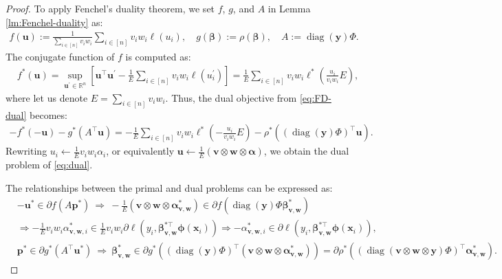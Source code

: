 	\begin{proof}
	To apply Fenchel's duality theorem, we set $f$, $g$, and $A$ in Lemma \ref{lm:Fenchel-duality} as:
	\begin{align*}
	f(\bm u) := \frac{1}{\sum_{i\in[n]} v_i w_i} \sum_{i \in\left[n\right]} v_i w_i \ell(u_i),
	\quad
	g(\bm\beta) := \rho(\bm\beta),
	\quad
	A := \operatorname{diag}(\bm y)\Phi.
	\end{align*}
	The conjugate function of $f$ is computed as:
	\begin{align*}
	& f^*(\bm u)
		= \sup_{\bm u^\prime\in\mathbb{R}^n} \left[\bm u^\top \bm u^\prime - \frac{1}{E} \sum_{i \in\left[n\right]} v_i w_i \ell(u^\prime_i)\right]
		= \frac{1}{E} \sum_{i \in\left[n\right]} v_i w_i \ell^*\left(\frac{u_i}{v_i w_i} {E} \right),
	\end{align*}
	where let us denote $E = \sum_{i\in[n]} v_i w_i$.
	Thus, the dual objective from \eqref{eq:FD-dual} becomes:
	\begin{align*}
	-f^*(-\bm u) - g^*(A^\top \bm u)
	= - \frac{1}{E} \sum_{i \in\left[n\right]} v_i w_i \ell^*\left(- \frac{u_i}{v_i w_i} {E} \right) - \rho^*((\operatorname{diag}(\bm y)\Phi)^\top \bm u).
	\end{align*}
	Rewriting $u_i \leftarrow \frac{1}{E} v_i w_i \alpha_i$, or equivalently $\bm u \leftarrow \frac{1}{E} (\bm v \otimes \bm w \otimes \bm\alpha)$, we obtain the dual problem of \eqref{eq:dual}.
	
	The relationships between the primal and dual problems can be expressed as:
	\begin{align*}
	& -\bm u^* \in \partial f(A \bm p^*)
		~\Rightarrow~
		-\frac{1}{E}(\bm v \otimes \bm w \otimes \bm\alpha_{\bm v, \bm w}^*) \in \partial f(\operatorname{diag}(\bm y)\Phi \bm\beta_{\bm v, \bm w}^*)\\
		& \Rightarrow
		-\frac{1}{E}v_i w_i \alpha^*_{\bm v, \bm w, i} \in \frac{1}{E}v_i w_i \partial\ell(y_i, \bm\beta_{\bm v, \bm w}^{* \top} \bm\phi(\bm{x}_i))
		\Rightarrow -\alpha^*_{\bm v, \bm w, i} \in \partial\ell(y_i, \bm\beta_{\bm v, \bm w}^{* \top} \bm\phi(\bm{x}_i)), \\
		& \bm p^* \in \partial g^*(A^\top \bm u^*)
		~\Rightarrow~
		\bm\beta_{\bm v, \bm w}^* \in \partial g^*((\operatorname{diag}(\bm y)\Phi)^\top (\bm v \otimes \bm w \otimes \bm\alpha_{\bm v, \bm w}^*))
		= \partial\rho^*((\operatorname{diag}(\bm v \otimes \bm w \otimes \bm y)\Phi)^\top \bm\alpha_{\bm v, \bm w}^*).
	\end{align*}
	\end{proof}